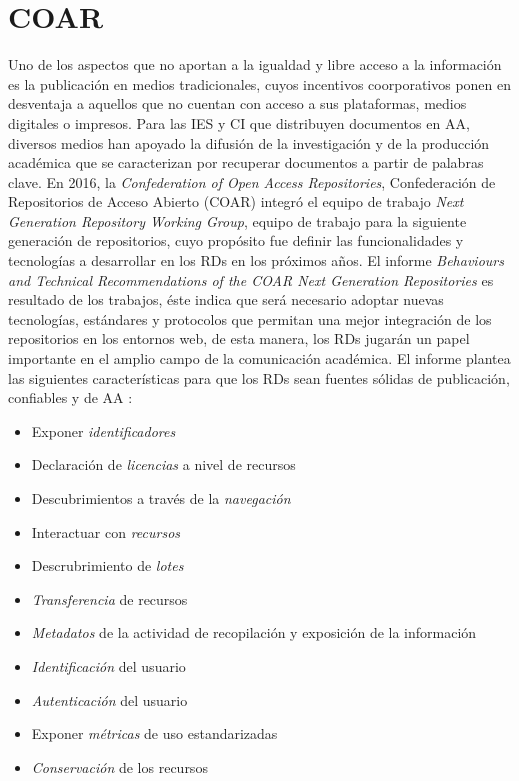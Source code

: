 \section{COAR}

Uno de los aspectos que no aportan a la igualdad y libre acceso a la informaci\'on es la publicaci\'on en medios tradicionales, cuyos incentivos coorporativos ponen en desventaja a aquellos que no cuentan con acceso a sus plataformas, medios digitales o impresos. Para las IES y CI que distribuyen documentos en AA, diversos medios han apoyado la difusi\'on de la investigaci\'on y de la producci\'on acad\'emica que se caracterizan por recuperar documentos a partir de palabras clave. En 2016, la \emph{Confederation of Open Access Repositories},  Confederaci\'on de Repositorios de Acceso Abierto (COAR) integr\'o el equipo de trabajo \textit{Next Generation Repository Working Group}, equipo de trabajo para la siguiente generaci\'on de repositorios, cuyo prop\'osito fue definir las funcionalidades y tecnolog\'ias a desarrollar en los RDs en los pr\'oximos a\~{n}os. El informe \textit{Behaviours and Technical Recommendations of the COAR Next Generation Repositories} \cite{NextGenerationRepositories} es resultado de los trabajos, \'este indica que ser\'a necesario adoptar nuevas tecnolog\'ias, est\'andares y protocolos que permitan una mejor integraci\'on de los repositorios en los entornos web, de esta manera, los RDs jugar\'an un papel importante en el amplio campo de la comunicaci\'on acad\'emica. El informe plantea las siguientes caracter\'isticas para que los RDs sean fuentes s\'olidas de publicaci\'on, confiables y de AA \cite{NextGenerationRepositories}:

\begin{itemize}
\item Exponer \textit{identificadores}
\item Declaraci\'on de \textit{licencias} a nivel de recursos
\item Descubrimientos a trav\'es de la \textit{navegaci\'on}
\item Interactuar con \textit{recursos}
\item Descrubrimiento de \textit{lotes}
\item \textit{Transferencia} de recursos
\item \textit{Metadatos} de la actividad de recopilaci\'on y exposici\'on de la informaci\'on
\item \textit{Identificaci\'on} del usuario
\item \textit{Autenticaci\'on} del usuario
\item Exponer \textit{m\'etricas} de uso estandarizadas
\item \textit{Conservaci\'on} de los recursos
\end{itemize}

